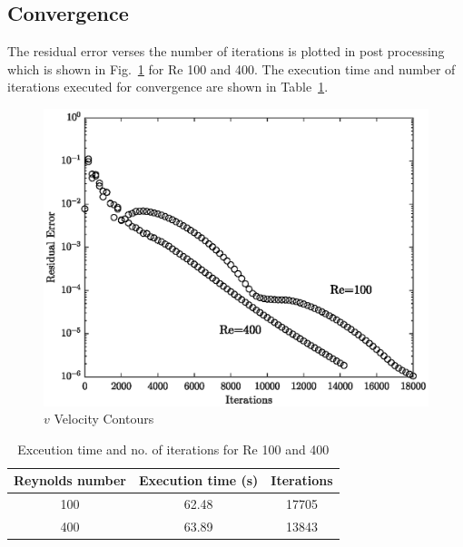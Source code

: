 \documentclass{article}
\numberwithin{equation}{section}
\numberwithin{figure}{section}
\begin{document}
\subsection{Convergence}
The residual error verses the number of iterations is plotted in post processing which is shown in  Fig.~\ref{fig:residual}  for Re 100 and 400. The execution time and number of iterations executed for convergence are shown in Table~\ref{tab:residual}.
\begin{figure}[H]
    \centering
    \includegraphics{residual.eps}
    \caption{$v$ Velocity Contours}
    \label{fig:residual}
\end{figure}

\begin{table}
    \centering
    \caption{Exceution time and no. of iterations for Re 100 and 400}
    \label{tab:residual}
    \begin{tabular}{c c c }
        \toprule
        Reynolds number & Execution time (s)   &Iterations \\
        \midrule
        100             & 62.48      & 17705         \\
        400            &63.89 & 13843        \\
        \bottomrule        
    \end{tabular}
\end{table}
\end{document}
